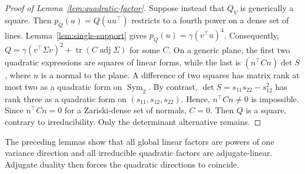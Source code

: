 \documentclass[12pt,a4paper]{article}
\theoremstyle{plain}
\theoremstyle{definition}
\newcommand{\Sym}{\operatorname{Sym}}
\newcommand{\tr}{\operatorname{tr}}
\newcommand{\adjm}{\operatorname{adj}}
\begin{document}
\begin{proof}[Proof of Lemma~\ref{lem:quadratic-factor}]
    Suppose instead that $Q_V$ is generically a square.
    Then $p_Q(u)=Q(uu^\top)$ restricts to a fourth power on a dense set of lines.
    Lemma~\ref{lem:single-support} gives $p_Q(u)=\gamma(v^\top u)^4$.
    Consequently, $Q=\gamma(v^\top\Sigma v)^2+\tr(C\adjm\Sigma)$ for some $C$.
    On a generic plane, the first two quadratic expressions are squares of linear forms, while the last is $(n^\top Cn)\det S$, where $n$ is a normal to the plane.
    A difference of two squares has matrix rank at most two as a quadratic form on $\Sym_2$.
    By contrast, $\det S=s_{11}s_{22}-s_{12}^2$ has rank three as a quadratic form on $(s_{11},s_{12},s_{22})$.
    Hence, $n^\top Cn\ne0$ is impossible.
    Since $n^\top Cn=0$ for a Zariski-dense set of normals, $C=0$.
    Then $Q$ is a square, contrary to irreducibility.
    Only the determinant alternative remains.
\end{proof}

The preceding lemmas show that all global linear factors are powers of one variance direction and all irreducible quadratic factors are adjugate-linear.
Adjugate duality then forces the quadratic directions to coincide.
\end{document}
